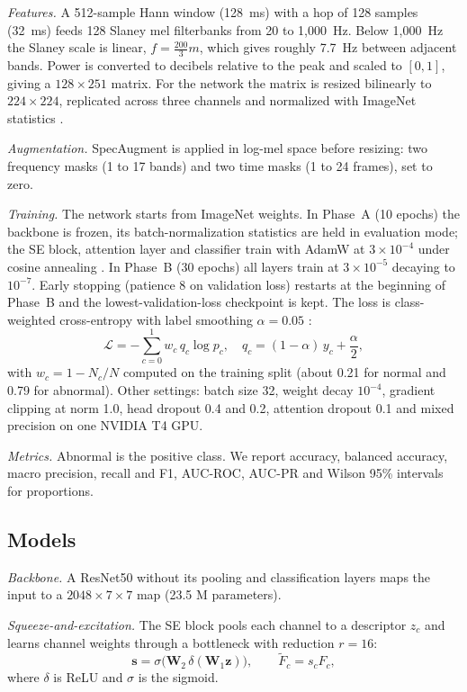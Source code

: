 \documentclass[conference]{IEEEtran}
\begin{document}
\textit{Features.} A 512-sample Hann window (128~ms) with a hop of 128 samples (32~ms) feeds 128 Slaney mel filterbanks from 20 to 1,000~Hz. Below 1,000~Hz the Slaney scale is linear, $f = \tfrac{200}{3}m$, which gives roughly 7.7~Hz between adjacent bands. Power is converted to decibels relative to the peak and scaled to $[0,1]$, giving a $128\times251$ matrix. For the network the matrix is resized bilinearly to $224\times224$, replicated across three channels and normalized with ImageNet statistics \cite{deng}.

\textit{Augmentation.} SpecAugment \cite{park} is applied in log-mel space before resizing: two frequency masks (1 to 17 bands) and two time masks (1 to 24 frames), set to zero.

\textit{Training.} The network starts from ImageNet weights. In Phase~A (10 epochs) the backbone is frozen, its batch-normalization statistics are held in evaluation mode; the SE block, attention layer and classifier train with AdamW \cite{adamw} at $3\times10^{-4}$ under cosine annealing \cite{sgdr}. In Phase~B (30 epochs) all layers train at $3\times10^{-5}$ decaying to $10^{-7}$. Early stopping (patience 8 on validation loss) restarts at the beginning of Phase~B and the lowest-validation-loss checkpoint is kept. The loss is class-weighted cross-entropy with label smoothing $\alpha=0.05$ \cite{szegedy}:
\begin{equation}
\mathcal{L} = -\sum_{c=0}^{1} w_c\, q_c \log p_c,\quad q_c = (1-\alpha)\,y_c + \frac{\alpha}{2},
\end{equation}
with $w_c = 1 - N_c/N$ computed on the training split (about 0.21 for normal and 0.79 for abnormal). Other settings: batch size 32, weight decay $10^{-4}$, gradient clipping at norm 1.0, head dropout 0.4 and 0.2, attention dropout 0.1 and mixed precision \cite{micikevicius} on one NVIDIA T4 GPU.

\textit{Metrics.} Abnormal is the positive class. We report accuracy, balanced accuracy, macro precision, recall and F1, AUC-ROC, AUC-PR and Wilson 95\% intervals for proportions.

\subsection{Models}
\textit{Backbone.} A ResNet50 \cite{he} without its pooling and classification layers maps the input to a $2048\times7\times7$ map (23.5 M parameters).

\textit{Squeeze-and-excitation.} The SE block \cite{hu} pools each channel to a descriptor $z_c$ and learns channel weights through a bottleneck with reduction $r=16$:
\begin{equation}
\mathbf{s} = \sigma\!\big(\mathbf{W}_2\,\delta(\mathbf{W}_1\mathbf{z})\big),\qquad \tilde{F}_c = s_c F_c,
\end{equation}
where $\delta$ is ReLU and $\sigma$ is the sigmoid.
\end{document}
